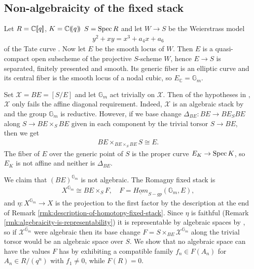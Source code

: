 \documentclass[12pt,dvipsnames]{amsart}
\begin{document}
\subsection{Non-algebraicity of the fixed stack}\label{sec:non-algebraicity-of-the-fixed-stack}

\begin{example}\label{example:affine-diagonal-is-necessary}
  Let \(R = \mathbb C[\hspace{-2pt}[q]\hspace{-2pt}]\), $K = \mathbb C(\hspace{-2pt}(q)\hspace{-2pt})$ \(S = \operatorname{Spec} R\) and let \(W \to S\) be the Weierstrass model
  \begin{align*}
    y^2 + xy = x^3 + a_4x + a_6
  \end{align*}
  of the Tate curve \cite{silverman_AdvancedTopicsArithmetic1999}. Now let \(E\) be the smooth locus of \(W\). Then \(E\) is a quasi-compact open subscheme of the projective \(S\)-scheme \(W\), hence \(E\to S\) is separated, finitely presented and smooth. Its generic fiber is an elliptic curve and its central fiber is the smooth locus of a nodal cubic, so \(E_{\mathbb C} = \mathbb G_m\).

  Set \(\mathcal X = BE = [S/E]\) and let \(\mathbb G_m\) act trivially on \(\mathcal X\). Then of the hypotheses in \cite[Theorem 1.2.1]{romagny_AlgebraicitySmoothnessFixed2022}, \(\mathcal X\) only fails the affine diagonal requirement. Indeed, \(\mathcal X\) is an algebraic stack by \cite[06PL]{stacks-project} and the group \(\mathbb G_m\) is reductive. However, if we base change \(\Delta_{BE}:BE\to BE_SBE\) along \(S\to BE\times_SBE\) given in each component by the trivial torsor \(S\to BE\), then we get
  \begin{align*}
    BE\times_{BE\times_SBE} S \cong E.
  \end{align*}
  The fiber of $E$ over the generic point of \(S\) is the proper curve \(E_K\to \operatorname{Spec} K\), so \(E_K\) is not affine and neither is \(\Delta_{BE}\).
  
  We claim that \((BE)^{\mathbb G_m}\) is not algebraic. The Romagny fixed stack is
  \begin{align*}
    X^{\mathbb G_m} \cong BE\times_S F, \hspace{1em} F = \underline{Hom}_{S-gp}(\mathbb G_m, E),
  \end{align*}
  and \(\eta:X^{\mathbb G_m}\to X\) is the projection to the first factor by the description at the end of Remark \ref{rmk:description-of-homotopy-fixed-stack}. Since \(\eta\) is faithful (Remark \ref{rmk:algebraicity-is-representability}) it is representable by algebraic spaces by \cite[\href{https://stacks.math.columbia.edu/tag/04Y5}{Tag 04Y5}]{stacks-project}, so if \(\mathcal X^{\mathbb G_m}\) were algebraic then its base change \(F = S\times_{BE}\mathcal X^{\mathbb G_m}\) along the trivial torsor would be an algebraic space over \(S\). We show that no algebraic space can have the values \(F\) has by exhibiting a compatible family \(f_n \in F(A_n)\) for \(A_n \in R/(q^n)\) with \(f_1 \neq 0\), while \(F(R) = 0\).
  

\end{example}
\end{document}
